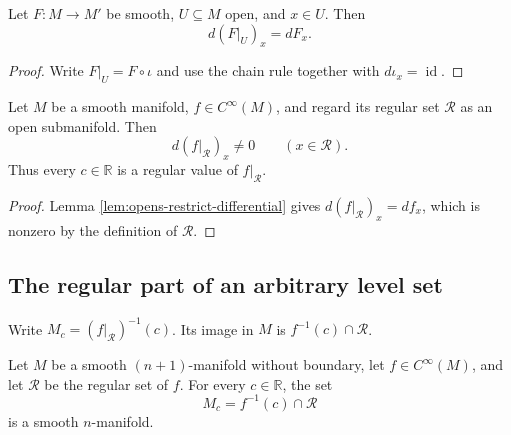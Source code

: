 \begin{lemma}
\label{lem:opens-restrict-differential}
\leanok
{}
Let $F\colon M\to M'$ be smooth, $U\subseteq M$ open, and $x\in U$. Then
\[
d(F|_U)_x=dF_x.
\]
\end{lemma}

\begin{proof}
\leanok
{}
\sketch Write $F|_U=F\circ\iota$ and use the chain rule together with
$d\iota_x=\operatorname{id}$.
\end{proof}

\begin{lemma}
\label{lem:regular-restrict-regular-value}
\leanok
{}
Let $M$ be a smooth manifold, $f\in C^\infty(M)$, and regard its regular set
$\mathcal R$ as an open submanifold. Then
\[
d(f|_{\mathcal R})_x\ne0\qquad(x\in\mathcal R).
\]
Thus every $c\in\mathbb R$ is a regular value of $f|_{\mathcal R}$.
\end{lemma}

\begin{proof}
\leanok
{}
\sketch Lemma \ref{lem:opens-restrict-differential} gives
$d(f|_{\mathcal R})_x=df_x$, which is nonzero by the definition of $\mathcal R$.
\end{proof}

\subsection*{The regular part of an arbitrary level set}

Write $M_c=(f|_{\mathcal R})^{-1}(c)$. Its image in $M$ is
$f^{-1}(c)\cap\mathcal R$.

\begin{proposition}
\label{prop:regular-level-set-hypersurface}
\leanok
{}
Let $M$ be a smooth $(n+1)$-manifold without boundary, let
$f\in C^\infty(M)$, and let $\mathcal R$ be the regular set of $f$. For every
$c\in\mathbb R$, the set
\[
M_c=f^{-1}(c)\cap\mathcal R
\]
is a smooth $n$-manifold.
\end{proposition}


